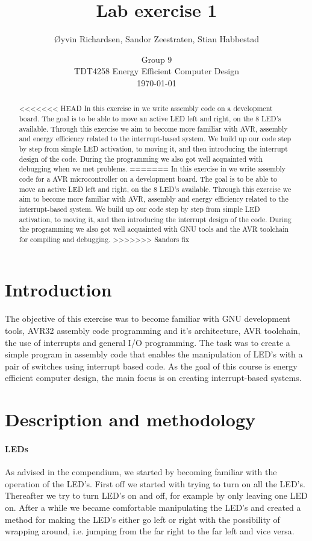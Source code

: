 \documentclass[a4paper,11pt]{article}
\title{Lab exercise 1}
\author{\O yvin Richardsen, Sandor Zeestraten, Stian Habbestad}
\date{{Group 9}\\
TDT4258 Energy Efficient Computer Design \\
\today}
\begin{document}
\maketitle
\newpage

\begin{abstract}
<<<<<<< HEAD
In this exercise in we write assembly code on a development board. The goal is to be able to move an active LED left and right, on the 8 LED's available. Through this exercise we aim to become more familiar with AVR, assembly and energy efficiency related to the interrupt-based system. We build up our code step by step from simple LED activation, to moving it, and then introducing the interrupt design of the code. During the programming we also got well acquainted with debugging when we met problems.
=======
In this exercise in we write assembly code for a AVR microcontroller on a development board. The goal is to be able to move an active LED left and right, on the 8 LED's available. Through this exercise we aim to become more familiar with AVR, assembly and energy efficiency related to the interrupt-based system. We build up our code step by step from simple LED activation, to moving it, and then introducing the interrupt design of the code. During the programming we also got well acquainted with GNU tools and the AVR toolchain for compiling and debugging.
>>>>>>> Sandors fix
\end{abstract}
\newpage

\tableofcontents
\newpage

\section{Introduction}
The objective of this exercise was to become familiar with GNU development tools, AVR32 assembly code programming and it’s architecture, AVR toolchain, the use of interrupts and general I/O programming. The task was to create a simple program in assembly code that enables the manipulation of LED’s with a pair of switches using interrupt based code. As the goal of this course is energy efficient computer design, the main focus is on creating interrupt-based systems. 

\section{Description and methodology}
\paragraph{LEDs}
As advised in the compendium, we started by becoming familiar with the operation of the LED's. First off we started with trying to turn on all the LED’s. Thereafter we try to turn LED’s on and off, for example by only leaving one LED on. After a while we became comfortable manipulating the LED's and created a method for making the LED's either go left or right with the possibility of wrapping around, i.e. jumping from the far right to the far left and vice versa.
\end{document}

